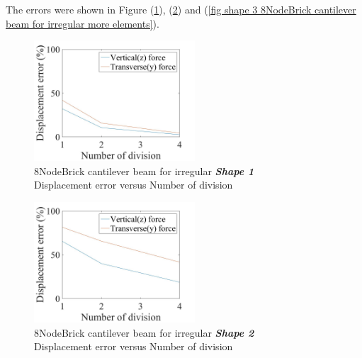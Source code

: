 \documentclass[fleqn,11pt,letter]{article}
\begin{document}
The errors were shown in Figure (\ref{fig shape 1 8NodeBrick cantilever beam for irregular more elements}), (\ref{fig shape 2 8NodeBrick cantilever beam for irregular more elements}) and (\ref{fig shape 3 8NodeBrick cantilever beam for irregular more elements}). 
\begin{figure}[H]
    \centering
    \includegraphics[width=6cm]{../Figure_files/8NodeBrick/error8brick_beam_irregular_shape1100.jpeg}
  \captionsetup{justification=centering,margin=3cm}
  \caption{8NodeBrick cantilever beam for irregular \emph{\textbf{Shape 1}}\\
      Displacement error   versus   Number of division}
  \label{fig shape 1 8NodeBrick cantilever beam for irregular more elements}
\end{figure}



\begin{figure}[H]
    \centering
    \includegraphics[width=6cm]{../Figure_files/8NodeBrick/error8brick_beam_irregular_shape2.jpeg}
  \captionsetup{justification=centering,margin=3cm}
  \caption{8NodeBrick cantilever beam for irregular \emph{\textbf{Shape 2}} \\
      Displacement error   versus   Number of division}
  \label{fig shape 2 8NodeBrick cantilever beam for irregular more elements}
\end{figure}
\end{document}
